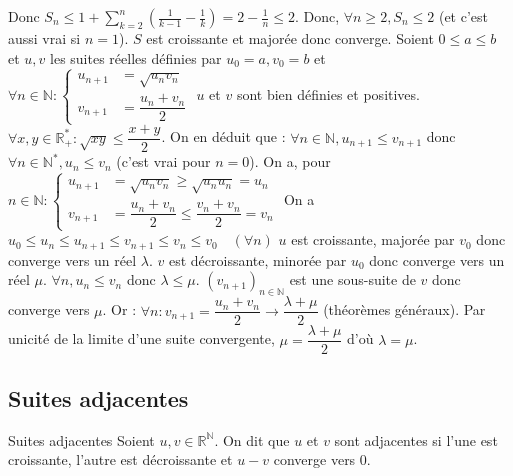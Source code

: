 \documentclass[12pt,a4paper]{report}
\begin{document}
\begin{exemple}
\newline Donc $S_n \leq 1+ \sum_{k=2}^{n}(\frac{1}{k-1}-\frac{1}{k})= 2-\frac{1}{n} \leq 2$.
\newline Donc, $\forall n \geq 2, S_n \leq 2$ (et c'est aussi vrai si $n=1$).
$S$ est croissante et majorée donc converge.
\newline \newline Soient $0 \leq a \leq b$ et $u,v$ les suites réelles définies par $u_0 = a, v_0 = b$ et $\forall n \in \mathbb{N} :
\begin{cases}
u_{n+1} & =\sqrt{u_nv_n} \\
v_{n+1} & =\dfrac{u_n + v_n}{2}
\end{cases}$
\newline $u$ et $v$ sont bien définies et positives.
\newline $\forall x,y \in \mathbb{R}^*_+ : \sqrt{xy} \leq \dfrac{x+y}{2}$.
\newline On en déduit que : $\forall n \in \mathbb{N}, u_{n+1} \leq v_{n+1}$ donc $\forall n \in \mathbb{N}^*, u_n \leq v_n$ (c'est vrai pour $n=0$).
\newline On a, pour $n \in \mathbb{N} :
\begin{cases}
u_{n+1} &= \sqrt{u_nv_n} \geq \sqrt{u_nu_n}=u_n \\
v_{n+1} &=\dfrac{u_n+v_n}{2} \leq \dfrac{v_n+v_n}{2}=v_n
\end{cases}$
\newline \newline On a $u_0 \leq u_n \leq u_{n+1} \leq v_{n+1} \leq v_n \leq v_0 \quad (\forall n)$
\newline $u$ est croissante, majorée par $v_0$ donc converge vers un réel $\lambda$.
\newline $v$ est décroissante, minorée par $u_0$ donc converge vers un réel $\mu$.
\newline $\forall n, u_n \leq v_n$ donc $\lambda \leq \mu$.
\newline $(v_{n+1})_{n \in \mathbb{N}}$ est une sous-suite de $v$ donc converge vers $\mu$.
\newline Or : $\forall n : v_{n+1} = \dfrac{u_n + v_n}{2} \longrightarrow \dfrac{\lambda + \mu}{2}$ (théorèmes généraux).
\newline Par unicité de la limite d'une suite convergente, $\mu = \dfrac{\lambda + \mu}{2}$ d'où $\lambda = \mu$.
\end{exemple}

\subsection{Suites adjacentes}
\begin{definition}{Suites adjacentes}{}
Soient $u,v \in \mathbb{R}^\mathbb{N}$. On dit que $u$ et $v$ sont adjacentes si l'une est croissante, l'autre est décroissante et $u-v$ converge vers $0$.
\end{definition}
\end{document}
